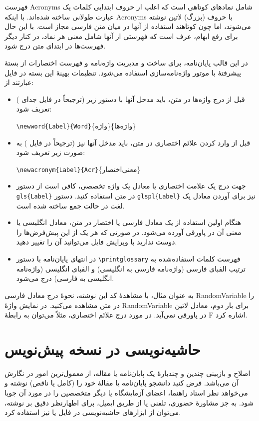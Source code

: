 فهرست
\glspl{Acronym}
شامل نمادهای کوتاهی است که اغلب از حروف ابتدایی کلمات یک عبارت طولانی ساخته شده‌اند. با اینکه
\glspl{Acronym}
با حروف (بزرگ) لاتین نوشته می‌شوند، اما چون کوتاهند استفاده از آنها در میان متن فارسی مجاز است. با این حال برای رفع ابهام، عرف است که فهرستی از آنها شامل معنی هر نماد، در کنار دیگر فهرست‌ها در ابتدای متن درج شود.

در این قالب پایان‌نامه، برای ساخت و مدیریت واژه‌نامه و فهرست اختصارات از بستهٔ پیشرفتهٔ
با موتور واژه‌نامه‌سازی
استفاده می‌شود. تنظیمات بهینهٔ این بسته در فایل
عبارتند از:
\begin{itemize}
	\item
قبل از درج واژه‌ها در متن، باید مدخل آنها با دستور زیر (ترجیحاً در فایل جدای ) تعریف شود:
	\begin{LTR}
	\verb|\newword{Label}{Word}|\{واژه\}\{واژه‌ها\}
	\end{LTR}
	
	\item
قبل از وارد کردن علائم اختصاری در متن، باید مدخل آنها نیز (ترجیحاً در فایل ) به صورت زیر تعریف شود:
	\begin{LTR}
	\verb|\newacronym{Label}{Acr}|\{معنی‌اختصار\}
	\end{LTR}

	\item
جهت درج یک علامت اختصاری یا معادل یک واژه تخصصی، کافی است از دستور
	\verb|gls{Label}|
در متن استفاده کنید. دستور
	\verb|glspl{Label}|
نیز برای آوردن معادل یک لغت در حالت جمع ساخته شده است.
	
	\item
هنگام اولین استفاده از یک معادل فارسی یا اختصار در متن، معادل انگلیسی یا معنی آن در پاورقی آورده می‌شود. در صورتی که هر یک از این پیش‌فرض‌ها را دوست ندارید با ویرایش فایل
می‌توانید آن را تغییر دهید.

	\item
در انتهای پایان‌نامه با دستور
\verb|\printglossary|
فهرست کلمات استفاده‌شده به ترتیب الفبای فارسی (واژه‌نامه فارسی به انگلیسی) و الفبای انگلیسی (واژه‌نامه انگلیسی به فارسی) درج می‌شود.
\end{itemize}

به عنوان مثال، با مشاهدهٔ کد این نوشته، نحوهٔ درج معادل فارسی
\gls{RandomVariable}
را در متن مشاهده می‌کنید.
در نمایش واژهٔ
\gls{RandomVariable}
برای بار دوم، معادل لاتین در پاورقی نمی‌آید.
در مورد درج علائم اختصاری، مثلاً می‌توان به رابطهٔ
\gls{F}
اشاره کرد.

\section{حاشیه‌نویسی در نسخه پیش‌نویس}
اصلاح و بازبینی چندین و چندبارهٔ یک پایان‌نامه یا مقاله، از معمول‌ترین امور در نگارش آن می‌باشد. فرض کنید دانشجو پایان‌نامه یا مقالهٔ خود را (کامل یا ناقص) نوشته و می‌خواهد نظر استاد راهنما، اعضای آزمایشگاه یا دیگر متخصصین را در مورد آن جویا شود. به جز مشاورهٔ حضوری، تلفنی یا از طریق ایمیل، برای اظهارنظر دقیق بر نوشته، می‌توان از ابزارهای حاشیه‌نویسی در فایل
یا 
نیز استفاده کرد.

